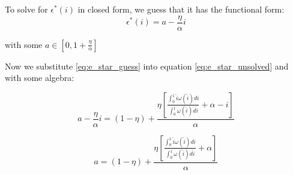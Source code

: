 \documentclass[WP]{AEA}
\begin{document}
To solve for $  \epsilon^*(i)$ in closed form, we guess that it has the functional form:
 \begin{equation} \label{eq:e_star_guess}
 \epsilon^*(i) = a-\frac{\eta }{\alpha}i
 \end{equation}
 
 with some  $a \in [0,1+\frac{\eta }{\alpha}]$

Now we substitute \ref{eq:e_star_guess} into equation \ref{eq:e_star_unsolved} and with some algebra:

$$a-\frac{\eta }{\alpha}i= (1-\eta) + \frac{   \eta \left[ \frac{\int_0^1 \hat{i} \omega(\hat{i}) di}{\int_0^1  \omega(\hat{i}) d\hat{i}} + \alpha -i \right] }{\alpha } $$

\begin{equation} \label{eq:a_solved}
a= (1-\eta) + \frac{   \eta\left[ \frac{\int_0^1 \hat{i} \omega(\hat{i}) di}{\int_0^1  \omega(\hat{i}) d\hat{i}} + \alpha  \right] }{\alpha} 
\end{equation}
\end{document}
